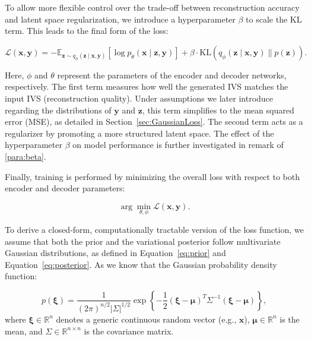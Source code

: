 \documentclass{article}
\begin{document}
{To allow more flexible control over the trade-off between reconstruction accuracy and latent space regularization, we introduce a hyperparameter $\beta$ to scale the KL term. This leads to the final form of the loss:

\begin{equation}\label{eq:ELBO_beta}
\mathcal{L}(\mathbf{x}, \mathbf{y}) 
= - \mathbb{E}_{\mathbf{z} \sim q_\phi(\mathbf{z} \mid \mathbf{x}, \mathbf{y})} \left[
\log p_\theta(\mathbf{x} \mid \mathbf{z}, \mathbf{y})
\right] + \beta \cdot \mathrm{KL}\left(q_\phi(\mathbf{z} \mid \mathbf{x}, \mathbf{y}) \parallel p(\mathbf{z}) \right).
\end{equation}


Here, $\phi$ and $\theta$ represent the parameters of the encoder and decoder networks, respectively. The first term measures how well the generated IVS matches the input IVS (reconstruction quality). Under assumptions we later introduce regarding the distributions of $\mathbf{y}$ and $\mathbf{z}$, this term simplifies to the mean squared error (MSE), as detailed in Section~\ref{sec:GaussianLoss}. The second term acts as a regularizer by promoting a more structured latent space. The effect of the hyperparameter $\beta$ on model performance is further investigated in remark of \autoref{para:beta}.

Finally, training is performed by minimizing the overall loss with respect to both encoder and decoder parameters:

\begin{equation}
\arg\min_{\theta, \phi} \mathcal{L}(\mathbf{x}, \mathbf{y}).
\end{equation}





To derive a closed-form, computationally tractable version of the loss function, we assume that both the prior and the variational posterior follow multivariate Gaussian distributions, as defined in Equation~\eqref{eq:prior} and Equation~\eqref{eq:posterior}. As we know that the Gaussian probability density function:

\begin{equation}
p(\boldsymbol{\xi}) = \frac{1}{(2\pi)^{n/2}|\Sigma|^{1/2}} \exp\left\{ -\frac{1}{2} (\boldsymbol{\xi} - \boldsymbol{\mu})^T \Sigma^{-1} (\boldsymbol{\xi} - \boldsymbol{\mu}) \right\},
\end{equation}
where $\boldsymbol{\xi} \in \mathbb{R}^n$ denotes a generic continuous random vector (e.g., $\mathbf{x}$), $\boldsymbol{\mu} \in \mathbb{R}^n$ is the mean, and $\Sigma \in \mathbb{R}^{n \times n}$ is the covariance matrix. 

}
\end{document}
